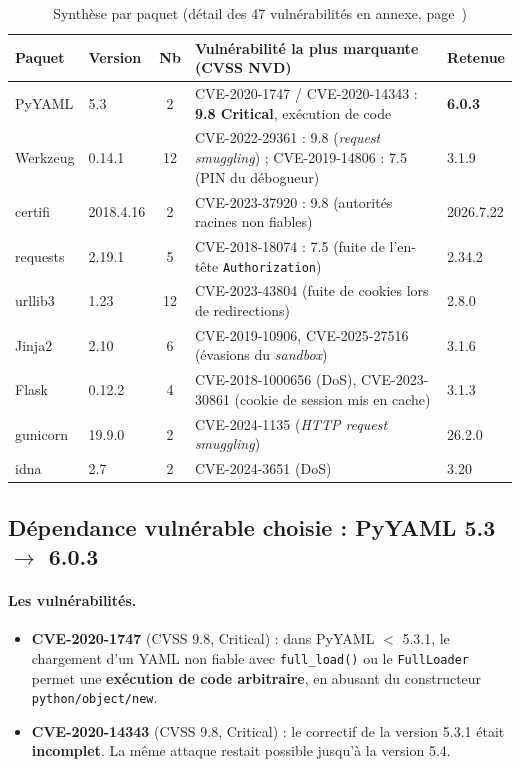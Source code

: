 \documentclass[11pt,a4paper]{article}
\newcommand{\code}[1]{\texttt{#1}}
\begin{document}
\begin{table}[H]
\centering
\small
\begin{tabularx}{\textwidth}{@{}llcLl@{}}
\toprule
\textbf{Paquet} & \textbf{Version} & \textbf{Nb} & \textbf{Vulnérabilité la plus marquante (CVSS NVD)} & \textbf{Retenue} \\
\midrule
PyYAML   & 5.3       & 2  & CVE-2020-1747 / CVE-2020-14343 : \textbf{9.8 Critical}, exécution de code & \textbf{6.0.3} \\
Werkzeug & 0.14.1    & 12 & CVE-2022-29361 : 9.8 (\emph{request smuggling}) ; CVE-2019-14806 : 7.5 (PIN du débogueur) & 3.1.9 \\
certifi  & 2018.4.16 & 2  & CVE-2023-37920 : 9.8 (autorités racines non fiables) & 2026.7.22 \\
requests & 2.19.1    & 5  & CVE-2018-18074 : 7.5 (fuite de l'en-tête \code{Authorization}) & 2.34.2 \\
urllib3  & 1.23      & 12 & CVE-2023-43804 (fuite de cookies lors de redirections) & 2.8.0 \\
Jinja2   & 2.10      & 6  & CVE-2019-10906, CVE-2025-27516 (évasions du \emph{sandbox}) & 3.1.6 \\
Flask    & 0.12.2    & 4  & CVE-2018-1000656 (DoS), CVE-2023-30861 (cookie de session mis en cache) & 3.1.3 \\
gunicorn & 19.9.0    & 2  & CVE-2024-1135 (\emph{HTTP request smuggling}) & 26.2.0 \\
idna     & 2.7       & 2  & CVE-2024-3651 (DoS) & 3.20 \\
\bottomrule
\end{tabularx}
\caption{Synthèse par paquet (détail des 47 vulnérabilités en annexe, page~\pageref{sec:cve})}
\end{table}

\subsection{Dépendance vulnérable choisie : PyYAML 5.3 \texorpdfstring{$\rightarrow$}{->} 6.0.3}\label{sec:pyyaml}
\paragraph{Les vulnérabilités.}
\begin{itemize}
  \item \textbf{CVE-2020-1747} (CVSS 9.8, Critical) : dans PyYAML $<$ 5.3.1, le chargement d'un
        YAML non fiable avec \code{full\_load()} ou le \code{FullLoader} permet une
        \textbf{exécution de code arbitraire}, en abusant du constructeur \code{python/object/new}.
  \item \textbf{CVE-2020-14343} (CVSS 9.8, Critical) : le correctif de la version 5.3.1 était
        \textbf{incomplet}. La même attaque restait possible jusqu'à la version 5.4.
\end{itemize}
\end{document}
